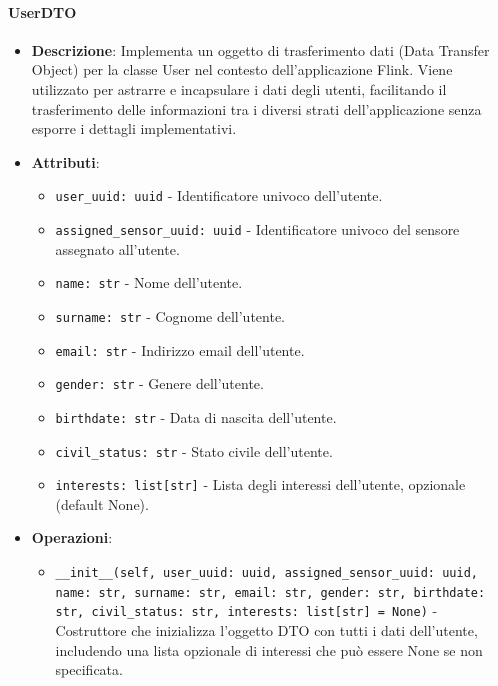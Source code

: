 \documentclass[10pt]{article}
\begin{document}
    \paragraph{UserDTO}
    \begin{itemize} 
    \item \textbf{Descrizione}: Implementa un oggetto di trasferimento dati (Data Transfer Object) per la classe User nel contesto dell'applicazione Flink. Viene utilizzato per astrarre e incapsulare i dati degli utenti, facilitando il trasferimento delle informazioni tra i diversi strati dell'applicazione senza esporre i dettagli implementativi.
    \item \textbf{Attributi}:
    \begin{itemize}
        \item \texttt{user\_uuid: uuid} - Identificatore univoco dell'utente.
        \item \texttt{assigned\_sensor\_uuid: uuid} - Identificatore univoco del sensore assegnato all'utente.
        \item \texttt{name: str} - Nome dell'utente.
        \item \texttt{surname: str} - Cognome dell'utente.
        \item \texttt{email: str} - Indirizzo email dell'utente.
        \item \texttt{gender: str} - Genere dell'utente.
        \item \texttt{birthdate: str} - Data di nascita dell'utente.
        \item \texttt{civil\_status: str} - Stato civile dell'utente.
        \item \texttt{interests: list[str]} - Lista degli interessi dell'utente, opzionale (default None).
    \end{itemize}
    
    \item \textbf{Operazioni}:
    \begin{itemize}
        \item \texttt{\_\_init\_\_(self, user\_uuid: uuid, assigned\_sensor\_uuid: uuid, name: str, surname: str, email: str, gender: str, birthdate: str, civil\_status: str, interests: list[str] = None)} - Costruttore che inizializza l'oggetto DTO con tutti i dati dell'utente, includendo una lista opzionale di interessi che può essere None se non specificata.
    \end{itemize}
    \end{itemize}
\end{document}

